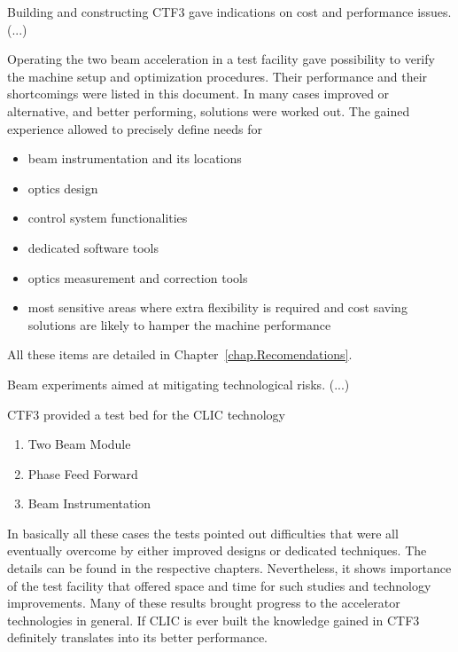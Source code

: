 Building and constructing CTF3 gave indications on cost and performance issues.
(...)


Operating the two beam acceleration in a test facility gave possibility to 
verify the machine setup and optimization procedures. 
Their performance and their shortcomings were listed in this document.
In many cases improved or alternative, and better performing, solutions were worked out. 
The gained experience allowed to precisely define needs for 
\begin{itemize}
\item beam instrumentation and its locations
\item optics design
\item control system functionalities
\item dedicated software tools
\item optics measurement and correction tools
\item most sensitive areas where extra flexibility is required and 
         cost saving solutions are likely to hamper the machine performance
\end{itemize}
All these items are detailed in Chapter~\ref{chap.Recomendations}.


Beam experiments aimed at mitigating technological risks. 
(...)

CTF3 provided a test bed for the CLIC technology
\begin{enumerate}
 \item Two Beam Module
 \item Phase Feed Forward
 \item Beam Instrumentation
\end{enumerate}
In basically all these cases the tests pointed out difficulties that were all eventually
overcome by either improved designs or dedicated techniques.
The details can be found in the respective chapters. 
Nevertheless, it shows importance of the test facility that offered space and time 
for such studies and technology improvements.
Many of these results brought progress to the accelerator technologies in general.
If CLIC is ever built the knowledge gained in CTF3 definitely translates into its better performance.






